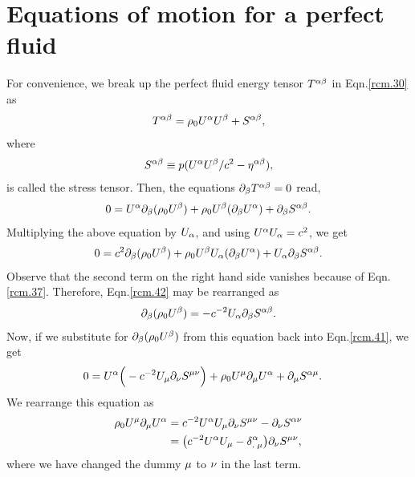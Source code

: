 \section{Equations of motion for a perfect  fluid}
For convenience, we break up  the perfect fluid energy 
tensor $T^{{\alpha}{\beta}}$ in Eqn.\eqref{rcm.30} as
\begin{align}\label{rcm.39}
T^{{\alpha}{\beta}}=\rho_0 U^{{\alpha}} U^{{\beta}} +S^{{\alpha}{\beta}},
\end{align}
where
\begin{align}\label{rcm.40}
S^{{\alpha}{\beta}}\equiv p(U^{{\alpha}} U^{{\beta}}/c^2
-\eta^{{\alpha}{\beta}}),
\end{align}
is called the {stress tensor}. Then, the equations
${\partial}_{{\beta}} T^{{\alpha}{\beta}}=0 $ read,
\begin{align}\label{rcm.41}
0=U^{{\alpha}}{\partial}_{{\beta}} (\rho_0 U^{{\beta}})
+\rho_0 U^{{\beta}} ({\partial}_{{\beta}} U^{{\alpha}})
+{\partial}_{{\beta}} S^{{\alpha}{\beta}}.
\end{align}
Multiplying the above equation by  $U_{{\alpha}}$, and using 
$U^{{\alpha}} U_{{\alpha}}=c^2$, we get
\begin{align}\label{rcm.42}
0= c^2 {\partial}_{{\beta}} ( \rho_0U^{{\beta}})
+\rho_0 U^{{\beta}}  U_{{\alpha}} ({\partial}_{{\beta}} U^{{\alpha}})
+U_{{\alpha}} {\partial}_{{\beta}} S^{{\alpha}{\beta}}.
\end{align}
Observe that  the second term on the right hand side  
vanishes because of Eqn.\eqref{rcm.37}. Therefore, 
Eqn.\eqref{rcm.42} may be rearranged as
\begin{align}\label{rcm.43}
 {\ensuremath{\partial}}_{{\beta}} ( \rho_0U^{{\beta}})
=-c^{-2} U_{{\alpha}} {\partial}_{{\beta}} S^{{\alpha}{\beta}}.
\end{align}
Now, if we substitute for ${\partial}_{{\beta}} (\rho_0 U^{{\beta}})$ from 
this equation back into Eqn.\eqref{rcm.41}, we get
\begin{align}\label{rcm.44}
0&=U^{{\alpha}}\Big(-c^{-2}U_{{\mu}}{\partial}_{{\nu}} S^{{\mu}{\nu}}\Big)
+ \rho_0 U^{{\mu}} {\partial}_{{\mu}} U^{{\alpha}} +
{\partial}_{{\mu}} S^{{\alpha} {\mu}}.
\end{align}
We rearrange this equation as 
\begin{align} \label{rcm.45}
\rho_0 U^{{\mu}}{\partial}_{{\mu}} U^{{\alpha}}
&=c^{-2}U^{{\alpha}} U_{{\mu}}
{\partial}_{{\nu}} S^{{\mu}{\nu}}-
{\partial}_{{\nu}} S^{{\alpha}{\nu}}\notag\\
&=\big(c^{-2}U^{{\alpha}} U_{{\mu}}-{{{\delta}}^{{\alpha}}_{.\;{\mu}}}
\big){\partial}_{{\nu}} S^{{\mu}{\nu}},
\end{align}
where we have changed the dummy ${\mu}$ to ${\nu}$ in the last
term.


